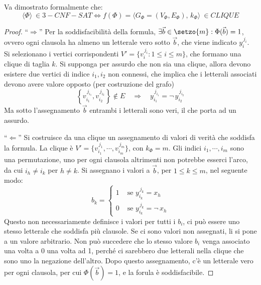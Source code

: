 Va dimostrato formalmente che:
\begin{equation*}
    \langle  \Phi  \rangle \: \in 3-CNF-SAT
    \Leftrightarrow
    f \left( \Phi \right) = 
    \langle  G_{\Phi} = \left( V_{\Phi} , E_{\Phi} \right), \, k_{\Phi}  \rangle
    \: \in CLIQUE
\end{equation*}
\begin{proof}
    ``$\Rightarrow$''
    Per la soddisfacibilità della formula, 
    $ \exists \vec{b} \in \setzo{m} : \Phi ( \vec{b} ) = 1 $,
    ovvero ogni clausola ha almeno un letterale vero sotto $\vec{b}$, che viene indicato $ y_{i}^{\,j_i} $.
    Si selezionano i vertici corrispondenti
    $ V' = \{ v_{i}^{\,j_i} : 1 \le i \le m \} $,
    che formano una clique di taglia $k$.
    Si supponga per assurdo che non sia una clique, allora devono esistere due vertici di indice $i_1, i_2$ non connessi, che implica che i letterali associati devono avere valore opposto (per costruzione del grafo)
    \begin{equation*}
        \left\{ 
            v_{i_1}^{\,j_{i_1}}
            ,
            v_{i_2}^{\,j_{i_2}}
        \right\}  \notin E
        \quad
        \Rightarrow
        \quad
        y_{i_1}^{\,j_{i_1}}
        = \neg \,
        y_{i_2}^{\,j_{i_2}}
    \end{equation*}
    Ma sotto l'assegnamento $\vec{b}$ entrambi i letterali sono veri, il che porta ad un assurdo.

    ``$\Leftarrow$''
    Si costruisce da una clique un assegnamento di valori di verità che soddisfa la formula. La clique è 
    $
    V' = \{ 
        v_{i_1}^{\,j_{1}}
        , \cdots,
        v_{i_m}^{\,j_{m}}
    \}
    $,
    con $k_{\Phi} = m$.
    Gli indici $i_1, \cdots, i_m$ sono una permutazione, uno per ogni clausola altrimenti non potrebbe esserci l'arco, da cui $i_h \ne i_k$ per $ h \ne k$. Si assegnano i valori a $\vec{b}$, per $1 \le k \le m$, nel seguente modo:
    \begin{equation*}
        b_k = 
        \begin{cases}
            1 & \text{ se } 
            y_{i_k}^{\,j_{k}} = x_h \\
            0 & \text{ se } 
            y_{i_k}^{\,j_{k}} = \neg \, x_h 
        \end{cases}
    \end{equation*}
    Questo non necessariamente definisce i valori per tutti i $b_i$, ci può essere uno stesso letterale che soddisfa più clausole. Se ci sono valori non assegnati, li si pone a un valore arbitrario.
    Non può succedere che lo stesso valore $b_i$ venga associato una volta a 0 una volta ad 1, perché ci sarebbero due letterali nella clique che sono uno la negazione dell'altro. Dopo questo assegnamento, c'è un letterale vero per ogni clausola, per cui $\Phi ( \vec{b} ) = 1$, e la forula è soddisfacibile.
\end{proof}

